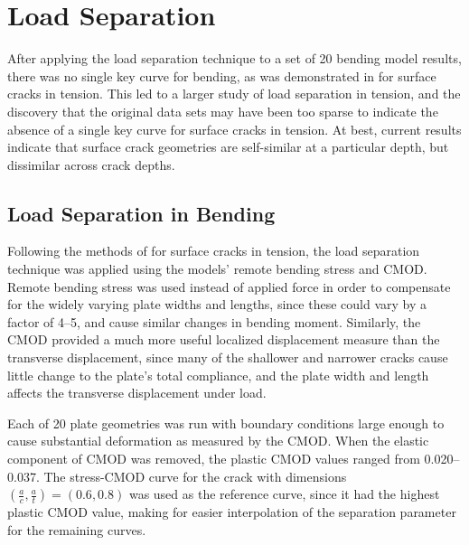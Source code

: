 \FloatBarrier
\section{Load Separation}
\label{sec:results-loadsep}

After applying the load separation technique to a set of 20 bending model results, there was no single key curve for bending, as was demonstrated in \citet{sharobeamlandes1994} for surface cracks in tension.
This led to a larger study of load separation in tension, and the discovery that the original data sets may have been too sparse to indicate the absence of a single key curve for surface cracks in tension.
At best, current results indicate that surface crack geometries are self-similar at a particular depth, but dissimilar across crack depths.

\subsection{Load Separation in Bending}

Following the methods of \citet{sharobeamlandes1994} for surface cracks in tension, the load separation technique was applied using the models' remote bending stress and CMOD.
Remote bending stress was used instead of applied force in order to compensate for the widely varying plate widths and lengths, since these could vary by a factor of 4--5, and cause similar changes in bending moment.
Similarly, the CMOD provided a much more useful localized displacement measure than the transverse displacement, since many of the shallower and narrower cracks cause little change to the plate's total compliance, and the plate width and length affects the transverse displacement under load.

Each of 20 plate geometries was run with boundary conditions large enough to cause substantial deformation as measured by the CMOD.
When the elastic component of CMOD was removed, the plastic CMOD values ranged from 0.020--0.037.
The stress-CMOD curve for the crack with dimensions \((\frac{a}{c}, \frac{a}{t})=(0.6, 0.8)\) was used as the reference curve, since it had the highest plastic CMOD value, making for easier interpolation of the \Sij separation parameter for the remaining curves.


